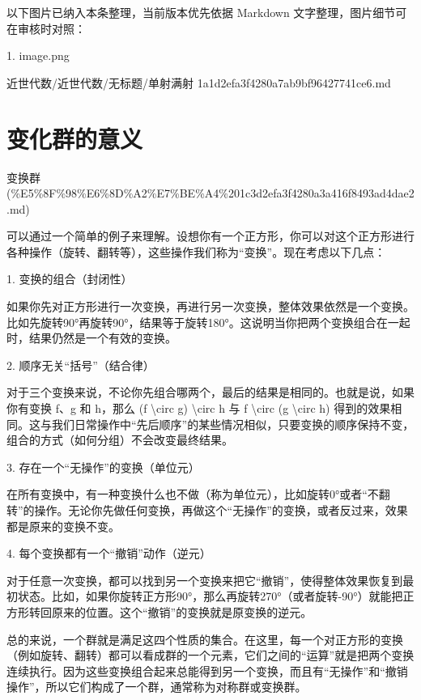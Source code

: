 \begin{note}[关联图片]
以下图片已纳入本条整理，当前版本优先依据 Markdown 文字整理，图片细节可在审核时对照：

1. image.png\\

\end{note}

\begin{note}[来源路径]

近世代数/近世代数/无标题/单射满射 1a1d2efa3f4280a7ab9bf96427741ce6.md

\end{note}

\section*{变化群的意义}

\begin{note}[来源上级主题]

变换群 (\%E5\%8F\%98\%E6\%8D\%A2\%E7\%BE\%A4\%201c3d2efa3f4280a3a416f8493ad4dae2.md)

\end{note}

\begin{note}[变化群的意义]

可以通过一个简单的例子来理解。设想你有一个正方形，你可以对这个正方形进行各种操作（旋转、翻转等），这些操作我们称为“变换”。现在考虑以下几点：

1.	变换的组合（封闭性）

如果你先对正方形进行一次变换，再进行另一次变换，整体效果依然是一个变换。比如先旋转90°再旋转90°，结果等于旋转180°。这说明当你把两个变换组合在一起时，结果仍然是一个有效的变换。

2.	顺序无关“括号”（结合律）

对于三个变换来说，不论你先组合哪两个，最后的结果是相同的。也就是说，如果你有变换 f、g 和 h，那么 (f \textbackslash{}circ g) \textbackslash{}circ h 与 f \textbackslash{}circ (g \textbackslash{}circ h) 得到的效果相同。这与我们日常操作中“先后顺序”的某些情况相似，只要变换的顺序保持不变，组合的方式（如何分组）不会改变最终结果。

3.	存在一个“无操作”的变换（单位元）

在所有变换中，有一种变换什么也不做（称为单位元），比如旋转0°或者“不翻转”的操作。无论你先做任何变换，再做这个“无操作”的变换，或者反过来，效果都是原来的变换不变。

4.	每个变换都有一个“撤销”动作（逆元）

对于任意一次变换，都可以找到另一个变换来把它“撤销”，使得整体效果恢复到最初状态。比如，如果你旋转正方形90°，那么再旋转270°（或者旋转-90°）就能把正方形转回原来的位置。这个“撤销”的变换就是原变换的逆元。

总的来说，一个群就是满足这四个性质的集合。在这里，每一个对正方形的变换（例如旋转、翻转）都可以看成群的一个元素，它们之间的“运算”就是把两个变换连续执行。因为这些变换组合起来总能得到另一个变换，而且有“无操作”和“撤销操作”，所以它们构成了一个群，通常称为对称群或变换群。

\end{note}

